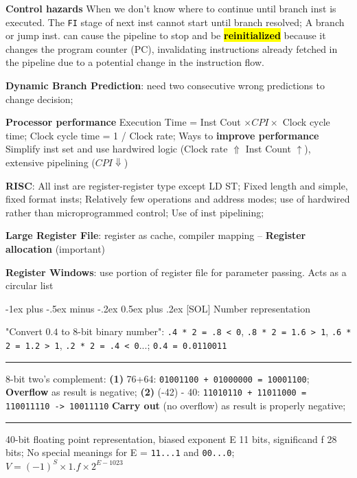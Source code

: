 \documentclass[a4paper]{article}
\makeatletter
\renewcommand{\section}{\@startsection{section}{1}{0mm}%
                                {-1ex plus -.5ex minus -.2ex}%
                                {0.5ex plus .2ex}%
                                {\normalfont\normalsize\bfseries}}
\makeatother
\begin{document}
\begin{multicols*}{2}
  \textbf{Control hazards} When we don't know where to continue until branch inst is executed. The \texttt{FI} stage of next inst cannot start until branch resolved; A branch or jump inst.  can cause the pipeline to stop and be \hl{\textbf{reinitialized}} because it changes the program counter (PC), invalidating instructions already fetched in the pipeline due to a potential change in the instruction flow.

  \textbf{Dynamic Branch Prediction}: need two consecutive wrong predictions to change decision;

  \textbf{Processor performance} Execution Time = Inst Cout $\times CPI \times$ Clock cycle time; Clock cycle time = 1 / Clock rate; Ways to \textbf{improve performance} Simplify inst set and use hardwired logic (Clock rate $\Uparrow$ Inst Count $\uparrow$), extensive pipelining ($CPI \Downarrow$)

  \textbf{RISC}: All inst are register-register type except LD ST; Fixed length and simple, fixed format insts; Relatively few operations and address modes; use of hardwired rather than microprogrammed control; Use of inst pipelining;

  \textbf{Large Register File}: register as cache, compiler mapping – \textbf{Register allocation} (important)

  \textbf{Register Windows}: use portion of register file for parameter passing. Acts as a circular list

  \section{[SOL] Number representation}

  "Convert $0.4$ to 8-bit binary number": \texttt{.4 * 2 = .8 < 0}, \texttt{.8 * 2 = 1.6 > 1}, \texttt{.6 * 2 = 1.2 > 1}, \texttt{.2 * 2 = .4 < 0}...; \texttt{0.4 = 0.0110011}

  \rule{1\linewidth}{0.4pt}

  8-bit two's complement: \textbf{(1)} 76+64: \texttt{01001100 + 01000000 = 10001100}; \textbf{Overflow} as result is negative;
  \textbf{(2)} (-42) - 40: \texttt{11010110 + 11011000 = 110011110 -> 10011110} \textbf{Carry out} (no overflow) as result is properly negative;

  \rule{1\linewidth}{0.4pt}

  40-bit floating point representation, biased exponent E 11 bits, significand f 28 bits; No special meanings for E = \texttt{11...1} and \texttt{00...0}; $V = (-1)^{S} \times 1.f \times 2^{E - 1023}$


\end{multicols*}
\end{document}

